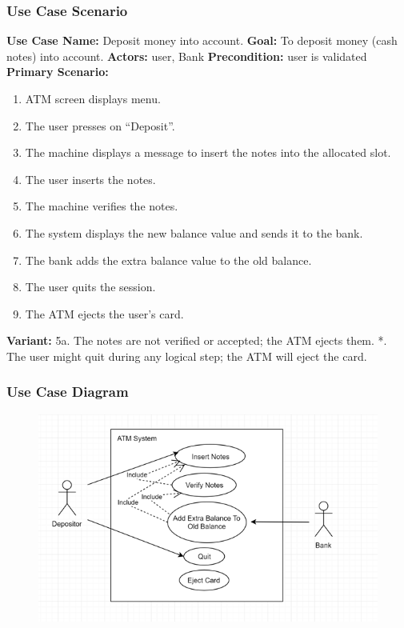 \documentclass{article}
\begin{document}
	\subsubsection{Use Case Scenario}
		\textbf{Use Case Name:}	Deposit money into account.
		\newline\textbf{Goal:} To deposit money (cash notes) into account.
		\newline\textbf{Actors:} user, Bank 	
		\newline\textbf{Precondition:} user is validated 	
		\newline\textbf{Primary Scenario:}	
			\begin{enumerate}[label*=\arabic*.]
				\item ATM screen displays menu.
			    \item The user presses on “Deposit”.
			    \item The machine displays a message to insert the notes into the allocated slot.
			    \item The user inserts the notes.
			    \item The machine verifies the notes.
			    \item The system displays the new balance value and sends it to the bank.
			    \item The bank adds the extra balance value to the old balance.
			    \item The user quits the session.
			    \item The ATM ejects the user’s card.
			\end{enumerate}
		\textbf{Variant:}\newline
			\hspace*{5mm}5a. The notes are not verified or accepted; the ATM ejects them.\newline
			\hspace*{5mm}*. The user might quit during any logical step; the ATM will eject the card.

		\newpage\subsubsection{Use Case Diagram}
			\begin{figure}[h!]
			  \includegraphics[width=\linewidth]{img/deposit_usecase.png}
			\end{figure}
\end{document}

